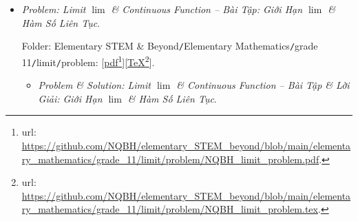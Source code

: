 \documentclass[12pt]{article}
\begin{document}
\begin{itemize}
	Folder: {\sf Elementary STEM \& Beyond{\tt/}Elementary Mathematics{\tt/}grade 11{\tt/}progression{\tt/}problem}: [\href{https://github.com/NQBH/elementary_STEM_beyond/blob/main/elementary_mathematics/grade_11/progression/problem/NQBH_progression_problem.pdf}{pdf}\footnote{{\sc url}: \url{https://github.com/NQBH/elementary_STEM_beyond/blob/main/elementary_mathematics/grade_11/progression/problem/NQBH_progression_problem.pdf}.}][\href{https://github.com/NQBH/elementary_STEM_beyond/blob/main/elementary_mathematics/grade_11/progression/problem/NQBH_progression_problem.tex}{\TeX}\footnote{{\sc url}: \url{https://github.com/NQBH/elementary_STEM_beyond/blob/main/elementary_mathematics/grade_11/progression/problem/NQBH_progression_problem.tex}.}].
	\begin{itemize}
		\item {\it Problem \& Solution: Arithmetic \& Geometric Progressions -- Bài Tập \& Lời Giải: Cấp Số Cộng \& Cấp Số Nhân}.
		
		Folder: {\sf Elementary STEM \& Beyond{\tt/}Elementary Mathematics{\tt/}grade 11{\tt/}progression{\tt/}solution}: [\href{https://github.com/NQBH/elementary_STEM_beyond/blob/main/elementary_mathematics/grade_11/progression/solution/NQBH_progression_solution.pdf}{pdf}\footnote{{\sc url}: \url{https://github.com/NQBH/elementary_STEM_beyond/blob/main/elementary_mathematics/grade_11/progression/solution/NQBH_progression_solution.pdf}.}][\href{https://github.com/NQBH/elementary_STEM_beyond/blob/main/elementary_mathematics/grade_11/progression/solution/NQBH_progression_solution.tex}{\TeX}\footnote{{\sc url}: \url{https://github.com/NQBH/elementary_STEM_beyond/blob/main/elementary_mathematics/grade_11/progression/solution/NQBH_progression_solution.tex}.}].
	\end{itemize}
	\item {\it Problem: Limit $\lim$ \& Continuous Function -- Bài Tập: Giới Hạn $\lim$ \& Hàm Số Liên Tục}.
	
	Folder: {\sf Elementary STEM \& Beyond{\tt/}Elementary Mathematics{\tt/}grade 11{\tt/}limit{\tt/}problem}: [\href{https://github.com/NQBH/elementary_STEM_beyond/blob/main/elementary_mathematics/grade_11/limit/problem/NQBH_limit_problem.pdf}{pdf}\footnote{{\sc url}: \url{https://github.com/NQBH/elementary_STEM_beyond/blob/main/elementary_mathematics/grade_11/limit/problem/NQBH_limit_problem.pdf}.}][\href{https://github.com/NQBH/elementary_STEM_beyond/blob/main/elementary_mathematics/grade_11/limit/problem/NQBH_limit_problem.tex}{\TeX}\footnote{{\sc url}: \url{https://github.com/NQBH/elementary_STEM_beyond/blob/main/elementary_mathematics/grade_11/limit/problem/NQBH_limit_problem.tex}.}].
	\begin{itemize}
		\item {\it Problem \& Solution: Limit $\lim$ \& Continuous Function -- Bài Tập \& Lời Giải: Giới Hạn $\lim$ \& Hàm Số Liên Tục}.
		

\end{itemize}
\end{itemize}
\end{document}

